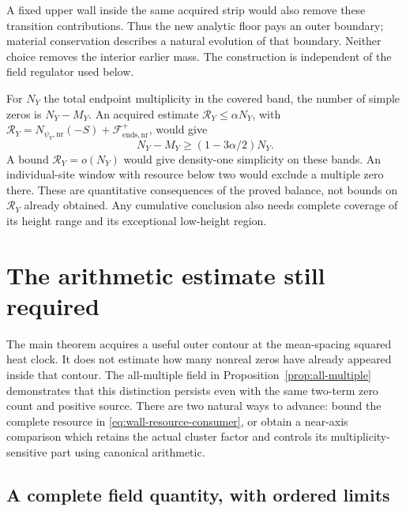 \documentclass[11pt]{article}
\newcommand{\nr}{\mathrm{nr}}
\newcommand{\FF}{\mathcal F}
\theoremstyle{remark}
\begin{document}
A fixed upper wall inside the same acquired strip would also remove
these transition contributions. Thus the new analytic floor pays an
outer boundary; material conservation describes a natural evolution
of that boundary. Neither choice removes the interior earlier mass.
The construction is independent of the field regulator used below.

For $N_Y$ the total endpoint multiplicity in the covered band, the
number of simple zeros is $N_Y-M_Y$. An acquired estimate
$\mathcal R_Y\le\alpha N_Y$, with
$\mathcal R_Y=N_{\psi_Y,\nr}(-S)+\FF_{\mathrm{ends},\nr}^{+}$,
would give
\[
 N_Y-M_Y\ge(1-3\alpha/2)N_Y.
\]
A bound $\mathcal R_Y=o(N_Y)$ would give density-one simplicity on
these bands. An individual-site window with resource below two would
exclude a multiple zero there. These are quantitative consequences of
the proved balance, not bounds on $\mathcal R_Y$ already obtained.
Any cumulative conclusion also needs complete coverage of its height
range and its exceptional low-height region.

\section{The arithmetic estimate still required}
\label{sec:next-arithmetic}

The main theorem acquires a useful outer contour at the mean-spacing
squared heat clock. It does not estimate how many nonreal zeros have
already appeared inside that contour. The all-multiple field in
Proposition~\ref{prop:all-multiple} demonstrates that this distinction
persists even with the same two-term zero count and positive source.
There are two natural ways to advance: bound the complete resource in
\eqref{eq:wall-resource-consumer}, or obtain a near-axis comparison
which retains the actual cluster factor and controls its
multiplicity-sensitive part using canonical arithmetic.

\subsection{A complete field quantity, with ordered limits}
\end{document}
